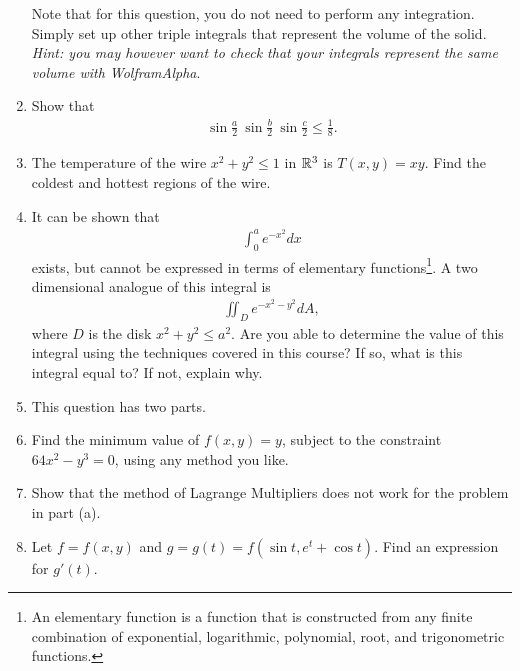 \documentclass{article}
\begin{document}
\begin{enumerate}
Note that for this question, you do not need to perform any integration. Simply set up other triple integrals that represent the volume of the solid.
\textit{Hint: you may however want to check that your integrals represent the same volume with WolframAlpha}.
\item %
Show that 
\begin{align*}
  \sin\frac{a}{2} \ \sin\frac{b}{2} \ \sin\frac{c}{2}\le\frac{1}{8}.
\end{align*}
\item %
The temperature of the wire $x^2+y^2\le1$ in $\mathbb{R}^3$ is $T(x,y)=xy$. Find the coldest and hottest regions of the wire. 
\item %
It can be shown that 
\begin{align*}
  \int_0^a e^{-x^2}dx 
\end{align*}
exists, but cannot be expressed in terms of elementary functions\footnote{An elementary function is a function that is constructed from any finite combination of exponential, logarithmic, polynomial, root, and trigonometric functions.}. A two dimensional analogue of this integral is
\begin{align*}
  \iint_D e^{-x^2-y^2} dA,
\end{align*}
where $D$ is the disk $x^2+y^2\le a^2$. Are you able to determine the value of this integral using the techniques covered in this course? If so, what is this integral equal to? If not, explain why. 

\item %
This question has two parts.
\BEN
\item Find the minimum value of $f(x,y) = y$, subject to the constraint $64x^2-y^3=0$, using any method you like.
\item Show that the method of Lagrange Multipliers does not work for the problem in part (a). 
\EEN
\item %
Let $f=f(x,y)$ and $g=g(t)=f(\sin t, e^t+\cos t)$. Find an expression for $g'(t)$.


\end{enumerate}
\end{document}
